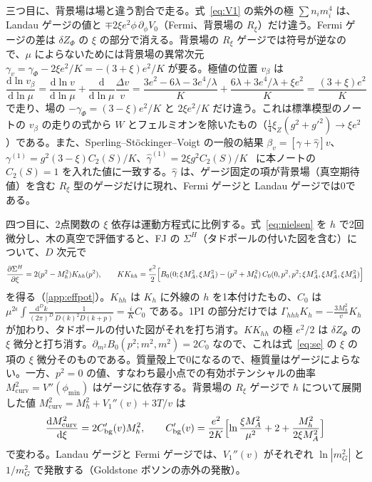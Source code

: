 \documentclass[a4paper,10pt]{ltjsarticle}
\newcommand{\dd}{\mathrm{d}}
\begin{document}
三つ目に、背景場は場と違う割合で走る。式~\eqref{eq:V1} の紫外の極 $\sum n_im_i^4$ は、Landau ゲージの値と $\mp2\xi e^2\phi\,\partial_\phi V_0$（Fermi、背景場の $R_\xi$）だけ違う。Fermi ゲージの差は $\delta Z_\Phi$ の $\xi$ の部分で消える。背景場の $R_\xi$ ゲージでは符号が逆なので、$\mu$ によらないためには背景場の異常次元 $\gamma_v=\gamma_\Phi-2\xi e^2/K=-(3+\xi)e^2/K$ が要る。極値の位置 $v_\beta$ は
\begin{equation}
\frac{\dd\ln v_\beta}{\dd\ln\mu}=\frac{\dd\ln v}{\dd\ln\mu}+\frac{\dd}{\dd\ln\mu}\frac{\Delta v}v=\frac{3e^2-6\lambda-3e^4/\lambda}K+\frac{6\lambda+3e^4/\lambda+\xi e^2}K=\frac{(3+\xi)e^2}K
\label{eq:vbeta}
\end{equation}
で走り、場の $-\gamma_\Phi=(3-\xi)e^2/K$ と $2\xi e^2/K$ だけ違う。これは標準模型のノートの $v_\beta$ の走りの式から $W$ とフェルミオンを除いたもの（$\frac14\xi_Z(g^2+g'^2)\to\xi e^2$）である。また、Sperling--Stöckinger--Voigt の一般の結果 $\beta_v=[\gamma+\hat\gamma]v$、$\gamma^{(1)}=g^2(3-\xi)C_2(S)/K$、$\hat\gamma^{(1)}=2\xi g^2C_2(S)/K$~\cite{ssv13} に本ノートの $C_2(S)=1$ を入れた値に一致する。$\hat\gamma$ は、ゲージ固定の項が背景場（真空期待値）を含む $R_\xi$ 型のゲージだけに現れ、Fermi ゲージと Landau ゲージでは0である。

四つ目に、2点関数の $\xi$ 依存は運動方程式に比例する。式~\eqref{eq:nielsen} を $h$ で2回微分し、木の真空で評価すると、FJ の $\Sigma^H$（タドポールの付いた図を含む）について、$D$ 次元で
\begin{equation}
\frac{\partial\Sigma^H}{\partial\xi}=2(p^2-M_h^2)K_{hh}(p^2),\qquad
KK_{hh}=\frac{e^2}2\Bigl[B_0(0;\xi M_A^2,\xi M_A^2)-(p^2+M_h^2)\,C_0(0,p^2,p^2;\xi M_A^2,\xi M_A^2,\xi M_A^2)\Bigr]
\label{eq:nielsen2}
\end{equation}
を得る（\ref{app:effpot}）。$K_{hh}$ は $K_h$ に外線の $h$ を1本付けたもの、$C_0$ は $\mu^{2\epsilon}\int\frac{\dd^Dk}{(2\pi)^D}\frac1{D(k)^2D(k+p)}=\frac iKC_0$ である。1PI の部分だけでは $\Gamma_{hhh}K_h=-\frac{3M_h^2}vK_h$ が加わり、タドポールの付いた図がそれを打ち消す。$KK_{hh}$ の極 $e^2/2$ は $\delta Z_\Phi$ の $\xi$ 微分と打ち消す。$\partial_{m^2}B_0(p^2;m^2,m^2)=2C_0$ なので、これは式~\eqref{eq:se} の $\xi$ の項の $\xi$ 微分そのものである。質量殻上で0になるので、極質量はゲージによらない。一方、$p^2=0$ の値、すなわち最小点での有効ポテンシャルの曲率 $M_{\mathrm{curv}}^2=V''(\phi_{\min})$ はゲージに依存する。背景場の $R_\xi$ ゲージで $\hbar$ について展開した値 $M_{\mathrm{curv}}^2=M_h^2+V_1''(v)+3T/v$ は
\begin{equation*}
\frac{\dd M_{\mathrm{curv}}^2}{\dd\xi}=2C_{\mathrm{bg}}'(v)M_h^2,\qquad
C_{\mathrm{bg}}'(v)=\frac{e^2}{2K}\Bigl[\ln\frac{\xi M_A^2}{\mu^2}+2+\frac{M_h^2}{2\xi M_A^2}\Bigr]
\end{equation*}
で変わる。Landau ゲージと Fermi ゲージでは、$V_1''(v)$ がそれぞれ $\ln|m_G^2|$ と $1/m_G^2$ で発散する（Goldstone ボソンの赤外の発散）。
\end{document}
